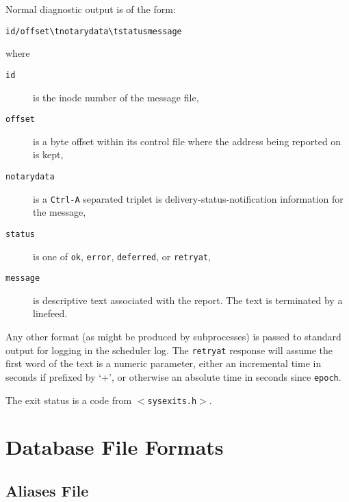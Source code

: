 Normal diagnostic output is of the form:
\begin{alltt}
id / offset \verb/\t/ notarydata \verb/\t/ status message
\end{alltt}

where
\begin{description}
\item[{\tt id}] \mbox{}

is the inode number of the message file,

\item[{\tt offset}] \mbox{}

is a byte offset within its control file where the address
being  reported on  is kept,

\item[{\tt notarydata}] \mbox{}

is a {\tt Ctrl-A} separated triplet is delivery-status-notification
information for  the message, 

\item[{\tt status}] \mbox{}

is one of {\tt ok}, {\tt error}, {\tt deferred}, or {\tt retryat},

\item[{\tt message}] \mbox{}

is  descriptive  text  associated
with  the  report.   The text is terminated by a linefeed.

\end{description}


Any other format (as might be produced by subprocesses) is
passed  to  standard  output  for logging in the scheduler
log. The {\tt retryat} response will assume the first word  of
the text is a numeric parameter, either an incremental
time in seconds if prefixed by `+', or otherwise an absolute
time in seconds since {\tt epoch}.

The exit status is a code from {\tt {\(<\)}sysexits.h{\(>\)}}.



\section{Database File Formats}



\subsection{Aliases File}



